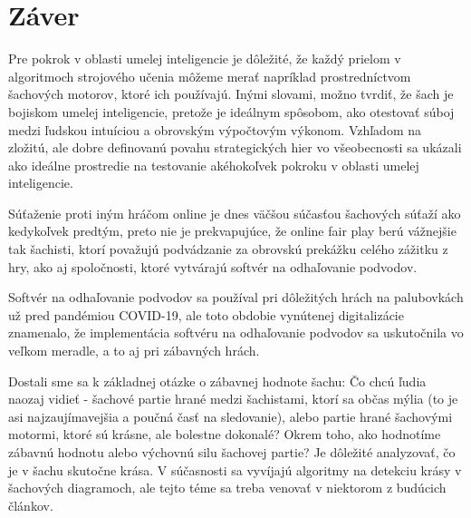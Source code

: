 \documentclass[10pt,oneside,slovak,a4paper]{article}
\begin{document}
\section{Záver}

Pre pokrok v oblasti umelej inteligencie je dôležité, že každý prielom v algoritmoch strojového učenia môžeme merať napríklad prostredníctvom šachových motorov, ktoré ich používajú. Inými slovami, možno tvrdiť, že šach je bojiskom umelej inteligencie, pretože je ideálnym spôsobom, ako otestovať súboj medzi ľudskou intuíciou a obrovským výpočtovým výkonom. Vzhľadom na zložitú, ale dobre definovanú povahu strategických hier vo všeobecnosti sa ukázali ako ideálne prostredie na testovanie akéhokoľvek pokroku v oblasti umelej inteligencie.

Súťaženie proti iným hráčom online je dnes väčšou súčasťou šachových súťaží ako kedykoľvek predtým, preto nie je prekvapujúce, že online fair play berú vážnejšie tak šachisti, ktorí považujú podvádzanie za obrovskú prekážku celého zážitku z hry, ako aj spoločnosti, ktoré vytvárajú softvér na odhaľovanie podvodov.

Softvér na odhaľovanie podvodov sa používal pri dôležitých hrách na palubovkách už pred pandémiou COVID-19, ale toto obdobie vynútenej digitalizácie znamenalo, že implementácia softvéru na odhaľovanie podvodov sa uskutočnila vo veľkom meradle, a to aj pri zábavných hrách.

Dostali sme sa k základnej otázke o zábavnej hodnote šachu: Čo chcú ľudia naozaj vidieť - šachové partie hrané medzi šachistami, ktorí sa občas mýlia (to je asi najzaujímavejšia a poučná časť na sledovanie), alebo partie hrané šachovými motormi, ktoré sú krásne, ale bolestne dokonalé? Okrem toho, ako hodnotíme zábavnú hodnotu alebo výchovnú silu šachovej partie? Je dôležité analyzovať, čo je v šachu skutočne krása. V súčasnosti sa vyvíjajú algoritmy na detekciu krásy v šachových diagramoch, ale tejto téme sa treba venovať v niektorom z budúcich článkov.








\end{document}
